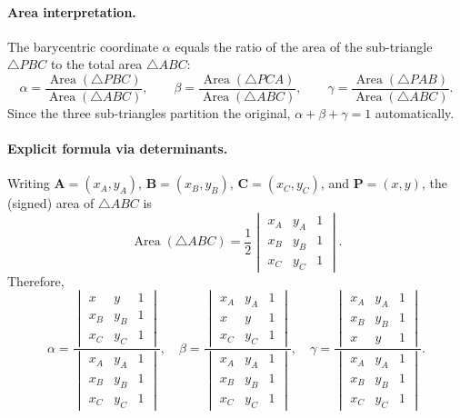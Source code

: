 \paragraph{Area interpretation.}
The barycentric coordinate $\alpha$ equals the ratio of the area of the sub-triangle $\triangle PBC$ to the total area $\triangle ABC$:
\[
    \alpha = \frac{\operatorname{Area}(\triangle PBC)}{\operatorname{Area}(\triangle ABC)},
    \qquad
    \beta  = \frac{\operatorname{Area}(\triangle PCA)}{\operatorname{Area}(\triangle ABC)},
    \qquad
    \gamma = \frac{\operatorname{Area}(\triangle PAB)}{\operatorname{Area}(\triangle ABC)}.
\]
Since the three sub-triangles partition the original, $\alpha + \beta + \gamma = 1$ automatically.

\paragraph{Explicit formula via determinants.}
Writing $\mathbf{A} = (x_A, y_A)$, $\mathbf{B} = (x_B, y_B)$, $\mathbf{C} = (x_C, y_C)$, and $\mathbf{P} = (x, y)$, the (signed) area of $\triangle ABC$ is
\[
    \operatorname{Area}(\triangle ABC) = \frac{1}{2}
    \begin{vmatrix}
        x_A & y_A & 1 \\
        x_B & y_B & 1 \\
        x_C & y_C & 1
    \end{vmatrix}.
\]
Therefore,
\[
    \alpha = \frac{
        \begin{vmatrix}
            x   & y   & 1 \\
            x_B & y_B & 1 \\
            x_C & y_C & 1
        \end{vmatrix}
    }{
        \begin{vmatrix}
            x_A & y_A & 1 \\
            x_B & y_B & 1 \\
            x_C & y_C & 1
        \end{vmatrix}
    },
\quad
    \beta = \frac{
        \begin{vmatrix}
            x_A & y_A & 1 \\
            x   & y   & 1 \\
            x_C & y_C & 1
        \end{vmatrix}
    }{
        \begin{vmatrix}
            x_A & y_A & 1 \\
            x_B & y_B & 1 \\
            x_C & y_C & 1
        \end{vmatrix}
    },
\quad
    \gamma = \frac{
        \begin{vmatrix}
            x_A & y_A & 1 \\
            x_B & y_B & 1 \\
            x   & y   & 1
        \end{vmatrix}
    }{
        \begin{vmatrix}
            x_A & y_A & 1 \\
            x_B & y_B & 1 \\
            x_C & y_C & 1
        \end{vmatrix}
    }.
\]

